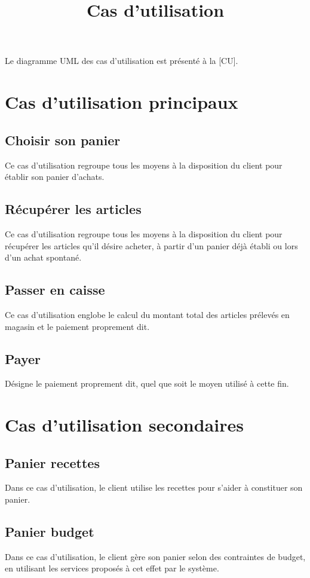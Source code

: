 \title{Cas d'utilisation}

Le diagramme UML des cas d'utilisation est présenté à la [CU].

\section{Cas d'utilisation principaux}

\subsection{Choisir son panier}
Ce cas d'utilisation regroupe tous les moyens à la disposition du client pour établir son panier d'achats.

\subsection{Récupérer les articles}
Ce cas d'utilisation regroupe tous les moyens à la disposition du client pour récupérer les articles qu'il désire acheter, à partir d'un panier déjà établi ou lors d'un achat spontané.

\subsection{Passer en caisse}
Ce cas d'utilisation englobe le calcul du montant total des articles prélevés en magasin et le paiement proprement dit.

\subsection{Payer}
Désigne le paiement proprement dit, quel que soit le moyen utilisé à cette fin.

\section{Cas d'utilisation secondaires}

\subsection{Panier recettes}
Dans ce cas d'utilisation, le client utilise les recettes pour s'aider à constituer son panier.

\subsection{Panier budget}
Dans ce cas d'utilisation, le client gère son panier selon des contraintes de budget, en utilisant les services proposés à cet effet par le système.


